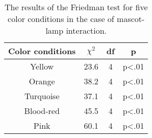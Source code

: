 \begin{table}[hbt!]
    \renewcommand{\arraystretch}{1}
    \begin{center}
        \begin{tabular}{|c|c|c|c|}
            \hline
            \textbf{Color conditions} & \textbf{$\chi^2$} & \textbf{df} & \textbf{p} \\
            \hline
            Yellow &23.6 &4 &p<.01 \\
            \hline
            Orange &38.2 &4 &p<.01\\
            \hline
            Turquoise &37.1 &4 &p<.01 \\
            \hline
            Blood-red &45.5 &4 &p<.01 \\
            \hline
            Pink &60.1 &4 &p<.01 \\
            \hline
        \end{tabular}
        \caption{The results of the Friedman test for five color conditions in the case of mascot-lamp interaction.}
        \label{table:friedmanML2}
    \end{center}
\end{table}

